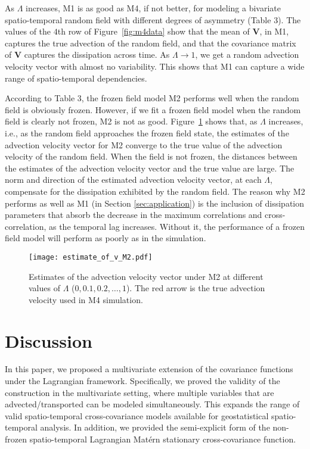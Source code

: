 \documentclass[12pt]{article}
\newcommand{\0}{\mathbf{0}}
\begin{document}
As $\Lambda$ increases, M1 is as good as M4, if not better, for modeling a bivariate spatio-temporal random field with different degrees of asymmetry (Table 3). The values of the $4$th row of Figure~\ref{fig:m4data} show that the mean of $\mathbf{V}$, in M1, captures the true advection of the random field, and that the covariance matrix of $\mathbf{V}$ captures the dissipation across time. As $\Lambda\rightarrow 1$, we get a random advection velocity vector with almost no variability. This shows that M1 can capture a wide range of spatio-temporal dependencies. 

According to Table 3, the frozen field model M2 performs well when the random field is obviously frozen. However, if we fit a frozen field model when the random field is clearly not frozen, M2 is not as good. Figure~\ref{fig:m2est} shows that, as $\Lambda$ increases, i.e., as the random field approaches the frozen field state, the estimates of the advection velocity vector for M2 converge to the true value of the advection velocity of the random field. When the field is not frozen, the distances between the estimates of the advection velocity vector and the true value are large. The norm and direction of the estimated advection velocity vector, at each $\Lambda$, compensate for the dissipation exhibited by the random field. The reason why M2 performs as well as M1 (in Section \ref{sec:application}) is the inclusion of dissipation parameters that absorb the decrease in the maximum correlations and cross-correlation, as the temporal lag increases.  Without it, the performance of a frozen field model will perform as poorly as in the simulation.
\begin{figure}[b!]
 \centering
 \texttt{[image: estimate\_of\_v\_M2.pdf]}
  \caption{\small Estimates of the advection velocity vector under M2 at different values of $\Lambda$ ($0, 0.1,0.2,\ldots,1$). The red arrow is the true advection velocity used in M4 simulation.}
    \label{fig:m2est}
\end{figure}


\section{Discussion} \label{sec:discussion}

In this paper, we proposed a multivariate extension of the covariance functions under the Lagrangian framework. Specifically, we proved the validity of the construction in the multivariate setting, where multiple variables that are advected/transported can be modeled simultaneously. This expands the range of valid spatio-temporal cross-covariance models available for geostatistical spatio-temporal analysis. In addition, we provided the semi-explicit form of the non-frozen spatio-temporal Lagrangian Mat\'{e}rn stationary cross-covariance function.
\end{document}
